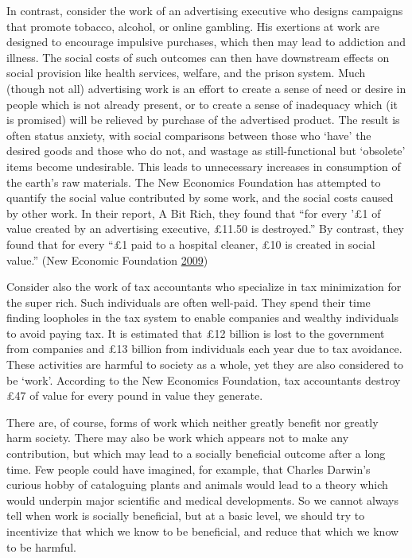 \documentclass[]{tufte-handout}
\begin{document}
In contrast, consider the work of an advertising executive who designs
campaigns that promote tobacco, alcohol, or online gambling. His
exertions at work are designed to encourage impulsive purchases, which
then may lead to addiction and illness. The social costs of such
outcomes can then have downstream effects on social provision like
health services, welfare, and the prison system. Much (though not all)
advertising work is an effort to create a sense of need or desire in
people which is not already present, or to create a sense of inadequacy
which (it is promised) will be relieved by purchase of the advertised
product. The result is often status anxiety, with social comparisons
between those who `have' the desired goods and those who do not, and
wastage as still-functional but `obsolete' items become undesirable.
This leads to unnecessary increases in consumption of the earth's raw
materials. The New Economics Foundation has attempted to quantify the
social value contributed by some work, and the social costs caused by
other work. In their report, A Bit Rich, they found that ``for every '£1
of value created by an advertising executive, £11.50 is destroyed.'' By
contrast, they found that for every ``£1 paid to a hospital cleaner, £10
is created in social value.'' (New Economic Foundation
\protect\hyperlink{ref-NewEconomicFoundation2009}{2009})

Consider also the work of tax accountants who specialize in tax
minimization for the super rich. Such individuals are often well-paid.
They spend their time finding loopholes in the tax system to enable
companies and wealthy individuals to avoid paying tax. It is estimated
that £12 billion is lost to the government from companies and £13
billion from individuals each year due to tax avoidance. These
activities are harmful to society as a whole, yet they are also
considered to be `work'. According to the New Economics Foundation, tax
accountants destroy £47 of value for every pound in value they generate.

There are, of course, forms of work which neither greatly benefit nor
greatly harm society. There may also be work which appears not to make
any contribution, but which may lead to a socially beneficial outcome
after a long time. Few people could have imagined, for example, that
Charles Darwin's curious hobby of cataloguing plants and animals would
lead to a theory which would underpin major scientific and medical
developments. So we cannot always tell when work is socially beneficial,
but at a basic level, we should try to incentivize that which we know to
be beneficial, and reduce that which we know to be harmful.
\end{document}
